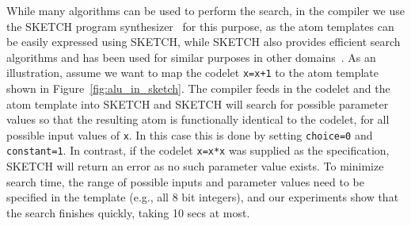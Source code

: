 While many algorithms can be used to perform the search, in the \pktlanguage
compiler we use the SKETCH program synthesizer~\cite{sketch_asplos} for this
purpose, as the atom templates can be easily expressed using SKETCH, while
SKETCH also provides efficient search algorithms and has been used for similar
purposes in other domains~\cite{bitstreaming, lifejoin, qbs, chlorophyll}.  As
an illustration, assume we want to map the codelet {\tt x=x+1} to the atom
template shown in Figure~\ref{fig:alu_in_sketch}. The \pktlanguage compiler
feeds in the codelet and the atom template into SKETCH and SKETCH will search
for possible parameter values so that the resulting atom is functionally
identical to the codelet, for all possible input values of {\tt x}.  In this
case this is done by setting {\tt choice=0} and {\tt constant=1}.  In contrast,
if the codelet {\tt x=x*x} was supplied as the specification, SKETCH will
return an error as no such parameter value exists. To minimize search time, the
range of possible inputs and parameter values need to be specified in the
template (e.g., all 8 bit integers), and our experiments show that the search
finishes quickly, taking 10 secs at most.


